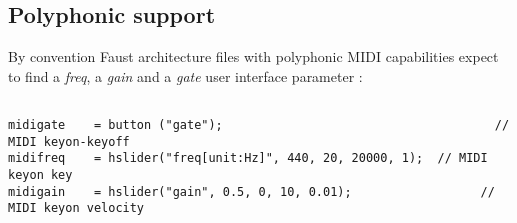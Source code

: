 \documentclass[a4paper]{article}
\begin{document}




\subsection{Polyphonic support}

By convention Faust architecture files with polyphonic MIDI capabilities expect to find a \textit{freq}, a \textit{gain} and a \textit{gate} user interface parameter :
{\small 
\begin{verbatim} 

midigate	= button ("gate");                             			// MIDI keyon-keyoff
midifreq	= hslider("freq[unit:Hz]", 440, 20, 20000, 1); 	// MIDI keyon key
midigain	= hslider("gain", 0.5, 0, 10, 0.01);	      	 	  // MIDI keyon velocity

\end{verbatim} 
}
\end{document}
